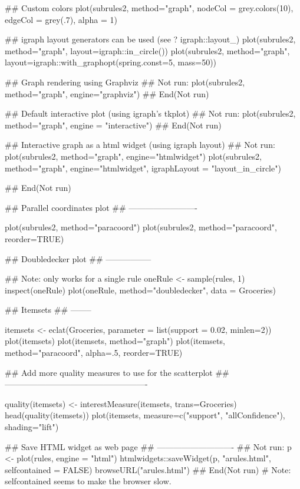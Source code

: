 \documentclass[letterpaper]{book}
\begin{document}
\begin{Examples}
\begin{ExampleCode}
## Custom colors
plot(subrules2, method="graph", 
  nodeCol = grey.colors(10), edgeCol = grey(.7), alpha = 1)

## igraph layout generators can be used (see ? igraph::layout_)
plot(subrules2, method="graph", layout=igraph::in_circle())
plot(subrules2, method="graph", 
  layout=igraph::with_graphopt(spring.const=5, mass=50))

## Graph rendering using Graphviz
## Not run: 
plot(subrules2, method="graph", engine="graphviz")
## End(Not run)

## Default interactive plot (using igraph's tkplot)
## Not run: 
plot(subrules2, method="graph", engine = "interactive")
## End(Not run)

## Interactive graph as a html widget (using igraph layout)
## Not run: 
plot(subrules2, method="graph", engine="htmlwidget")
plot(subrules2, method="graph", engine="htmlwidget", 
  igraphLayout = "layout_in_circle")

## End(Not run)

## Parallel coordinates plot
## -------------------------

plot(subrules2, method="paracoord")
plot(subrules2, method="paracoord", reorder=TRUE)

## Doubledecker plot 
## -----------------

## Note: only works for a single rule
oneRule <- sample(rules, 1)
inspect(oneRule)
plot(oneRule, method="doubledecker", data = Groceries)

## Itemsets
## --------

itemsets <- eclat(Groceries, parameter = list(support = 0.02, minlen=2))
plot(itemsets)
plot(itemsets, method="graph")
plot(itemsets, method="paracoord", alpha=.5, reorder=TRUE)

## Add more quality measures to use for the scatterplot
## ----------------------------------------------------

quality(itemsets) <- interestMeasure(itemsets, trans=Groceries)
head(quality(itemsets))
plot(itemsets, measure=c("support", "allConfidence"), shading="lift")

## Save HTML widget as web page
## ----------------------------
## Not run: 
p <- plot(rules, engine = "html")
htmlwidgets::saveWidget(p, "arules.html", selfcontained = FALSE)
browseURL("arules.html")
## End(Not run)
# Note: selfcontained seems to make the browser slow.
\end{ExampleCode}
\end{Examples}
\end{document}
